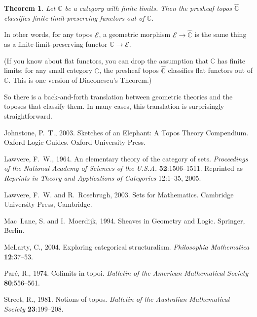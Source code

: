 \documentclass[12pt]{article}
\newcommand{\cat}[1]{\mathscr{#1}}
\newcommand{\scat}[1]{\mathbb{#1}}
\newcommand{\E}{\cat{E}}
\newcommand{\Psh}[1]{\widehat{#1}}
\newtheorem{thm}{Theorem}[section]
\begin{document}
\begin{thm}
Let $\scat{C}$ be a category with finite limits.  Then the presheaf topos
$\Psh{\scat{C}}$ classifies finite-limit-preserving functors out of
$\scat{C}$. 
\end{thm}
% 
In other words, for any topos $\E$, a geometric morphism $\E \to
\Psh{\scat{C}}$ is the same thing as a finite-limit-preserving functor
$\scat{C} \to \E$.

(If you know about flat functors, you can drop the assumption that $\scat{C}$
has finite limits: for any small category $\scat{C}$, the presheaf topos
$\Psh{\scat{C}}$ classifies flat functors out of $\scat{C}$.  This is
one version of Diaconescu's Theorem.)

So there is a back-and-forth translation between geometric theories and the
toposes that classify them.  In many cases, this translation is surprisingly
straightforward.



\begin{thebibliography}{7}

Johnstone, P.~T., 2003.
\newblock Sketches of an Elephant: A Topos Theory Compendium.
\newblock Oxford Logic Guides. Oxford University Press.

Lawvere, F.~W., 1964.
\newblock An elementary theory of the category of sets.
\newblock \emph{Proceedings of the National Academy of Sciences of the U.S.A.}
  \textbf{52}:1506--1511.
\newblock Reprinted as \emph{Reprints in Theory and Applications of Categories}
  12:1--35, 2005.

Lawvere, F.~W. and R.~Rosebrugh, 2003.
\newblock Sets for Mathematics.
\newblock Cambridge University Press, Cambridge.

Mac~Lane, S. and I.~Moerdijk, 1994.
\newblock Sheaves in Geometry and Logic.
\newblock Springer, Berlin.

Mc{L}arty, C., 2004.
\newblock Exploring categorical structuralism.
\newblock \emph{Philosophia Mathematica} \textbf{12}:37--53.

Par{\'e}, R., 1974.
\newblock Colimits in topoi.
\newblock \emph{Bulletin of the American Mathematical Society}
  \textbf{80}:556--561.

Street, R., 1981.
\newblock Notions of topos.
\newblock \emph{Bulletin of the Australian Mathematical Society}
  \textbf{23}:199--208.

\end{thebibliography}
\end{document}
